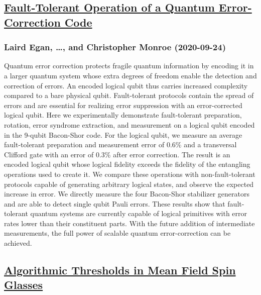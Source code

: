 \subsection*{\href{http://arxiv.org/abs/2009.11482v1}{Fault-Tolerant Operation of a Quantum Error-Correction Code}}
\subsubsection*{Laird Egan, \dots, and Christopher Monroe (2020-09-24)}
Quantum error correction protects fragile quantum information by encoding it
in a larger quantum system whose extra degrees of freedom enable the detection
and correction of errors. An encoded logical qubit thus carries increased
complexity compared to a bare physical qubit. Fault-tolerant protocols contain
the spread of errors and are essential for realizing error suppression with an
error-corrected logical qubit. Here we experimentally demonstrate
fault-tolerant preparation, rotation, error syndrome extraction, and
measurement on a logical qubit encoded in the 9-qubit Bacon-Shor code. For the
logical qubit, we measure an average fault-tolerant preparation and measurement
error of 0.6\% and a transversal Clifford gate with an error of 0.3\% after error
correction. The result is an encoded logical qubit whose logical fidelity
exceeds the fidelity of the entangling operations used to create it. We compare
these operations with non-fault-tolerant protocols capable of generating
arbitrary logical states, and observe the expected increase in error. We
directly measure the four Bacon-Shor stabilizer generators and are able to
detect single qubit Pauli errors. These results show that fault-tolerant
quantum systems are currently capable of logical primitives with error rates
lower than their constituent parts. With the future addition of intermediate
measurements, the full power of scalable quantum error-correction can be
achieved.

\subsection*{\href{http://arxiv.org/abs/2009.11481v1}{Algorithmic Thresholds in Mean Field Spin Glasses}}
